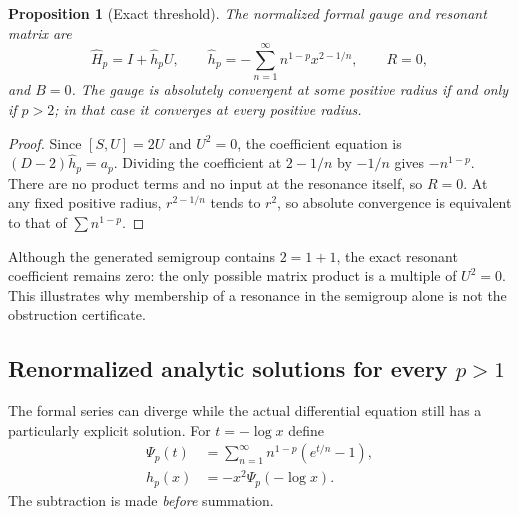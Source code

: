 \documentclass[11pt,a4paper]{article}
\numberwithin{equation}{section}
\newtheorem{proposition}[theorem]{Proposition}
\theoremstyle{definition}
\theoremstyle{remark}
\begin{document}
\begin{proposition}[Exact threshold]\label{prop:threshold}
The normalized formal gauge and resonant matrix are
\begin{equation}\label{eq:hhatp}
 \widehat H_p=I+\widehat h_p U,
 \qquad\widehat h_p=-\sum_{n=1}^{\infty}n^{1-p}x^{2-1/n},
 \qquad R=0,
\end{equation}
and $B=0$. The gauge is absolutely convergent at some positive radius if
and only if $p>2$; in that case it converges at every positive radius.
\end{proposition}
\begin{proof}
Since $[S,U]=2U$ and $U^2=0$, the coefficient equation is
$(D-2)\widehat h_p=a_p$. Dividing the coefficient at $2-1/n$ by
$-1/n$ gives $-n^{1-p}$. There are no product terms and no input at the
resonance itself, so $R=0$. At any fixed positive radius, $r^{2-1/n}$
tends to $r^2$, so absolute convergence is equivalent to that of
$\sum n^{1-p}$.
\end{proof}

Although the generated semigroup contains $2=1+1$, the exact resonant
coefficient remains zero: the only possible matrix product is a multiple
of $U^2=0$. This illustrates why membership of a resonance in the
semigroup alone is not the obstruction certificate.

\subsection{Renormalized analytic solutions for every $p>1$}
The formal series can diverge while the actual differential equation still
has a particularly explicit solution. For $t=-\log x$ define
\begin{align}
 \Psi_p(t)
   &=\sum_{n=1}^{\infty}n^{1-p}(e^{t/n}-1),                       \label{eq:Psi}\\
 h_p(x)&=-x^2\Psi_p(-\log x).                                   \label{eq:hp}
\end{align}
The subtraction is made \emph{before} summation.
\end{document}

